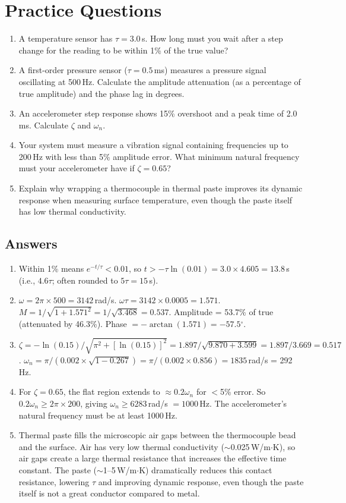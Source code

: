 \documentclass[11pt,letterpaper,twoside,openany]{book}
\providecommand{\ang}[1]{#1\ensuremath{{}^{\circ}}}
\begin{document}
\section{Practice Questions}
\begin{enumerate}[leftmargin=1.5em]
\item A temperature sensor has $\tau = 3.0$\,s. How long must you wait after a step change for the reading to be within 1\% of the true value?
\item A first-order pressure sensor ($\tau = 0.5$\,ms) measures a pressure signal oscillating at 500\,Hz. Calculate the amplitude attenuation (as a percentage of true amplitude) and the phase lag in degrees.
\item An accelerometer step response shows 15\% overshoot and a peak time of 2.0\,ms. Calculate $\zeta$ and $\omega_n$.
\item Your system must measure a vibration signal containing frequencies up to 200\,Hz with less than 5\% amplitude error. What minimum natural frequency must your accelerometer have if $\zeta = 0.65$?
\item Explain why wrapping a thermocouple in thermal paste improves its dynamic response when measuring surface temperature, even though the paste itself has low thermal conductivity.
\end{enumerate}

\subsection{Answers}
\begin{enumerate}[leftmargin=1.5em]
\item Within 1\% means $e^{-t/\tau} < 0.01$, so $t > -\tau \ln(0.01) = 3.0 \times 4.605 = 13.8$\,s (i.e., $4.6\tau$; often rounded to $5\tau = 15$\,s).
\item $\omega = 2\pi \times 500 = 3142$\,rad/s. $\omega\tau = 3142 \times 0.0005 = 1.571$. $M = 1/\sqrt{1 + 1.571^2} = 1/\sqrt{3.468} = 0.537$. Amplitude = 53.7\% of true (attenuated by 46.3\%). Phase $= -\arctan(1.571) = -57.5$\ang{}.
\item $\zeta = -\ln(0.15)/\sqrt{\pi^2 + [\ln(0.15)]^2} = 1.897/\sqrt{9.870 + 3.599} = 1.897/3.669 = 0.517$. $\omega_n = \pi/(0.002 \times \sqrt{1 - 0.267}) = \pi/(0.002 \times 0.856) = 1835$\,rad/s = 292\,Hz.
\item For $\zeta = 0.65$, the flat region extends to $\approx 0.2\omega_n$ for $<$5\% error. So $0.2\omega_n \geq 2\pi \times 200$, giving $\omega_n \geq 6283$\,rad/s $= 1000$\,Hz. The accelerometer's natural frequency must be at least 1000\,Hz.
\item Thermal paste fills the microscopic air gaps between the thermocouple bead and the surface. Air has very low thermal conductivity ($\sim$0.025\,W/m$\cdot$K), so air gaps create a large thermal resistance that increases the effective time constant. The paste ($\sim$1--5\,W/m$\cdot$K) dramatically reduces this contact resistance, lowering $\tau$ and improving dynamic response, even though the paste itself is not a great conductor compared to metal.
\end{enumerate}
\end{document}
